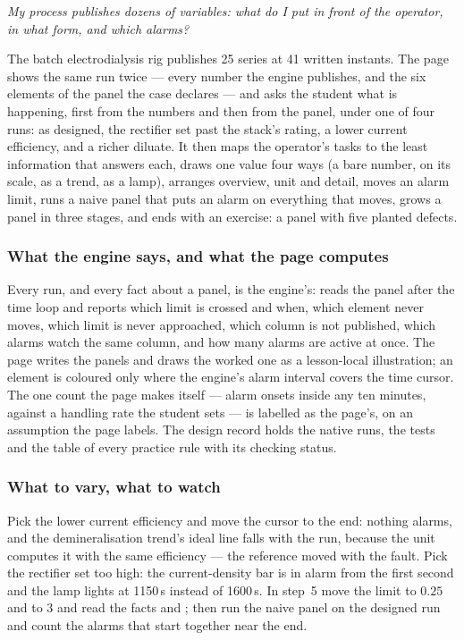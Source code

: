 \documentclass[11pt,a4paper]{article}
\begin{document}
\emph{My process publishes dozens of variables: what do I put in front of the
operator, in what form, and which alarms?}

The batch electrodialysis rig publishes 25 series at 41 written instants.
The page shows the same run twice --- every number the engine publishes, and
the six elements of the panel the case declares --- and asks the student
what is happening, first from the numbers and then from the panel, under
one of four runs: as designed, the rectifier set past the stack's rating, a
lower current efficiency, and a richer diluate.  It then maps the operator's
tasks to the least information that answers each, draws one value four ways
(a bare number, on its scale, as a trend, as a lamp), arranges overview, unit
and detail, moves an alarm limit, runs a naive panel that puts an alarm on
everything that moves, grows a panel in three stages, and ends with an
exercise: a panel with five planted defects.

\subsubsection*{What the engine says, and what the page computes}

Every run, and every fact about a panel, is the engine's: 
reads the panel after the time loop and reports which limit is crossed and
when, which element never moves, which limit is never approached, which
column is not published, which alarms watch the same column, and how many
alarms are active at once.  The page writes the panels and draws the worked
one as a lesson-local illustration; an element is coloured only where the
engine's alarm interval covers the time cursor.  The one count the page makes
itself --- alarm onsets inside any ten minutes, against a handling rate the
student sets --- is labelled as the page's, on an assumption the page
labels.  The design record 
holds the native runs, the tests and the table of every practice rule with
its checking status.

\subsubsection*{What to vary, what to watch}

\begin{tryit}
Pick the lower current efficiency and move the cursor to the end: nothing
alarms, and the demineralisation trend's ideal line falls with the run,
because the unit computes it with the same efficiency --- the reference moved
with the fault.  Pick the rectifier set too high: the current-density bar is
in alarm from the first second and the lamp lights at 1150\,s instead of 1600\,s.  In
step~5 move the limit to $0.25$ and to $3$ and read the facts
 and ; then run the naive panel on
the designed run and count the alarms that start together near the end.
\end{tryit}
\end{document}
